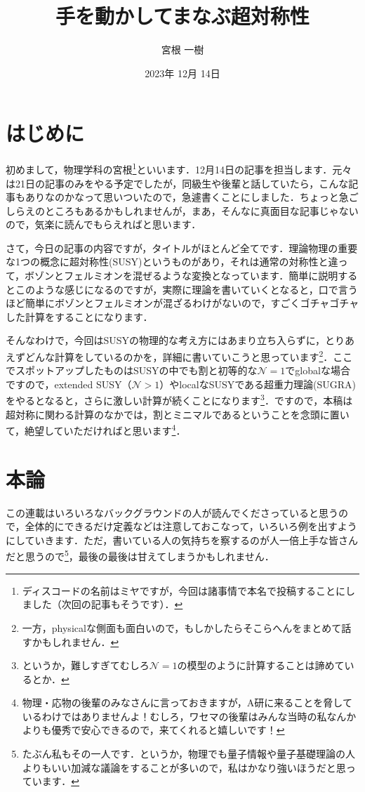 \documentclass[a4paper,uplatex,dvipdfmx]{jsarticle}
\title{手を動かしてまなぶ超対称性}
\author{宮根 一樹}
\date{2023年 12月 14日}
\theoremstyle{definition}
\begin{document}
\maketitle

\tableofcontents

\clearpage
\section{はじめに}

初めまして，物理学科の宮根\footnote{
  ディスコードの名前はミヤですが，今回は諸事情で本名で投稿することにしました（次回の記事もそうです）．
}といいます．12月14日の記事を担当します．元々は21日の記事のみをやる予定でしたが，同級生や後輩と話していたら，こんな記事もありなのかなって思いついたので，急遽書くことにしました．ちょっと急ごしらえのところもあるかもしれませんが，まあ，そんなに真面目な記事じゃないので，気楽に読んでもらえればと思います．

さて，今日の記事の内容ですが，タイトルがほとんど全てです．理論物理の重要な1つの概念に超対称性(SUSY)というものがあり，それは通常の対称性と違って，ボゾンとフェルミオンを混ぜるような変換となっています．簡単に説明するとこのような感じになるのですが，実際に理論を書いていくとなると，口で言うほど簡単にボゾンとフェルミオンが混ざるわけがないので，すごくゴチャゴチャした計算をすることになります．

そんなわけで，今回はSUSYの物理的な考え方にはあまり立ち入らずに，とりあえずどんな計算をしているのかを，詳細に書いていこうと思っています\footnote{
  一方，physicalな側面も面白いので，もしかしたらそこらへんをまとめて話すかもしれません．
}．ここでスポットアップしたものはSUSYの中でも割と初等的な$\mathcal{N}=1$でglobalな場合ですので，extended SUSY（$\mathcal{N}>1$）やlocalなSUSYである超重力理論(SUGRA)をやるとなると，さらに激しい計算が続くことになります\footnote{
  というか，難しすぎてむしろ$\mathcal{N}=1$の模型のように計算することは諦めているとか．
}．ですので，本稿は超対称に関わる計算のなかでは，割とミニマルであるということを念頭に置いて，絶望していただければと思います\footnote{
  物理・応物の後輩のみなさんに言っておきますが，A研に来ることを脅しているわけではありませんよ！むしろ，ワセマの後輩はみんな当時の私なんかよりも優秀で安心できるので，来てくれると嬉しいです！
}．


\section{本論}

この連載はいろいろなバックグラウンドの人が読んでくださっていると思うので，全体的にできるだけ定義などは注意しておこなって，いろいろ例を出すようにしていきます．ただ，書いている人の気持ちを察するのが人一倍上手な皆さんだと思うので\footnote{
  たぶん私もその一人です．というか，物理でも量子情報や量子基礎理論の人よりもいい加減な議論をすることが多いので，私はかなり強いほうだと思っています．
}，最後の最後は甘えてしまうかもしれません．
\end{document}
